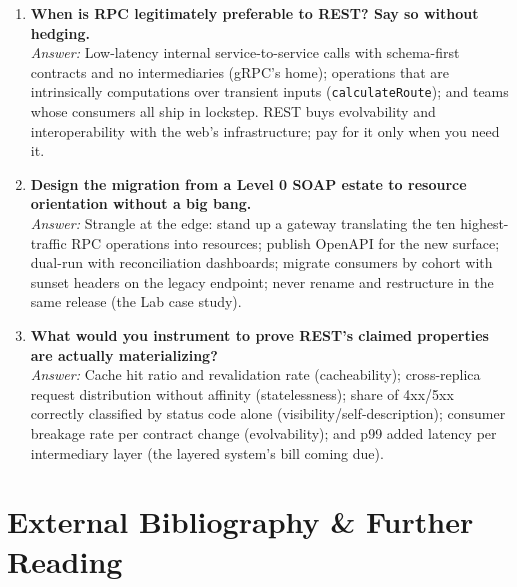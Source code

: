 \begin{enumerate}[label=\textbf{Q\arabic*.}, leftmargin=3.2em, itemsep=0.6em, resume]
{        Root-cause through the constraints.}\\
        \emph{Answer:} The cacheability constraint was violated by omission:
        responses carried no freshness metadata, so an intermediary guessed.
        Fix at the origin: validators plus explicit \texttt{Cache-Control}
        (\texttt{no-cache} revalidation for stock), and treat any response
        without a caching policy as a defect in review \cite{rfc9110}.
  \item \textbf{When is RPC legitimately preferable to REST? Say so without
        hedging.}\\
        \emph{Answer:} Low-latency internal service-to-service calls with
        schema-first contracts and no intermediaries (gRPC's home); operations
        that are intrinsically computations over transient inputs
        (\texttt{calculateRoute}); and teams whose consumers all ship in
        lockstep. REST buys evolvability and interoperability with the web's
        infrastructure; pay for it only when you need it.
  \item \textbf{Design the migration from a Level 0 SOAP estate to resource
        orientation without a big bang.}\\
        \emph{Answer:} Strangle at the edge: stand up a gateway translating the
        ten highest-traffic RPC operations into resources; publish OpenAPI for
        the new surface; dual-run with reconciliation dashboards; migrate
        consumers by cohort with sunset headers on the legacy endpoint; never
        rename and restructure in the same release (the Lab case study).
  \item \textbf{What would you instrument to prove REST's claimed properties
        are actually materializing?}\\
        \emph{Answer:} Cache hit ratio and revalidation rate (cacheability);
        cross-replica request distribution without affinity (statelessness);
        share of 4xx/5xx correctly classified by status code alone
        (visibility/self-description); consumer breakage rate per contract
        change (evolvability); and p99 added latency per intermediary layer
        (the layered system's bill coming due).
\end{enumerate}

\section{External Bibliography \& Further Reading}
\label{sec:ch3-bibliography}

